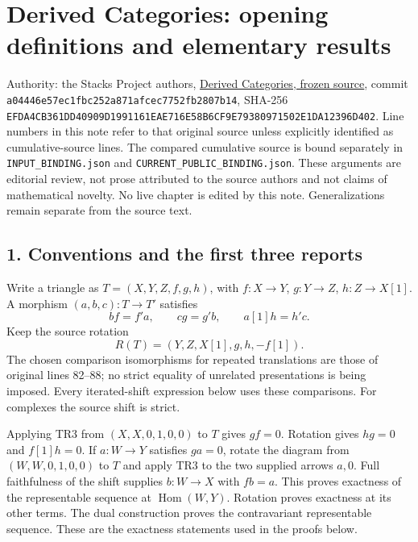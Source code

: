 \section{\texorpdfstring{Derived Categories:\allowbreak{} opening definitions and elementary results}{Derived  opening definitions and elementary results}}\label{proofs-0001-1140-derived-categories-opening-definitions-and-elementary-results}

Authority:\allowbreak{} the Stacks Project authors,\allowbreak{} \href{https://github.com/stacks/stacks-project/blob/a04446e57ec1fbc252a871afcec7752fb2807b14/derived.tex}{Derived Categories,\allowbreak{} frozen source},\allowbreak{} commit \texttt{a04446e5\allowbreak{}7ec1fbc2\allowbreak{}52a871af\allowbreak{}cec7752f\allowbreak{}b2807b14},\allowbreak{} SHA-256 \texttt{EFDA4CB3\allowbreak{}61DD4090\allowbreak{}9D199116\allowbreak{}1EAE716E\allowbreak{}58B6CF9E\allowbreak{}79380971\allowbreak{}502E1DA1\allowbreak{}2396D402}. Line numbers in this note refer to that original source unless explicitly identified as cumulative-source lines. The compared cumulative source is bound separately in \texttt{INPUT\_\allowbreak{}BINDING.\allowbreak{}json} and \texttt{CURRENT\_\allowbreak{}PUBLIC\_\allowbreak{}BINDING.\allowbreak{}json}. These arguments are editorial review,\allowbreak{} not prose attributed to the source authors and not claims of mathematical novelty. No live chapter is edited by this note. Generalizations remain separate from the source text.

\subsection{1. Conventions and the first three reports}\label{proofs-0001-1140-conventions-and-the-first-three-reports}

Write a triangle as \(T=(X,Y,Z,f,g,h)\),\allowbreak{} with \(f:X\to Y\),\allowbreak{} \(g:Y\to Z\),\allowbreak{} \(h:Z\to X[1]\). A morphism \((a,b,c):T\to T'\) satisfies \[
bf=f'a,\qquad cg=g'b,\qquad a[1]h=h'c.
\] Keep the source rotation \[
R(T)=(Y,Z,X[1],g,h,-f[1]).
\] The chosen comparison isomorphisms for repeated translations are those of original lines 82–\allowbreak{}88; no strict equality of unrelated presentations is being imposed. Every iterated-shift expression below uses these comparisons. For complexes the source shift is strict.

Applying TR3 from \((X,X,0,1,0,0)\) to \(T\) gives \(gf=0\). Rotation gives \(hg=0\) and \(f[1]h=0\). If \(a:W\to Y\) satisfies \(ga=0\),\allowbreak{} rotate the diagram from \((W,W,0,1,0,0)\) to \(T\) and apply TR3 to the two supplied arrows \(a,0\). Full faithfulness of the shift supplies \(b:W\to X\) with \(fb=a\). This proves exactness of the representable sequence at \(\operatorname{Hom}(W,Y)\). Rotation proves exactness at its other terms. The dual construction proves the contravariant representable sequence. These are the exactness statements used in the proofs below.

